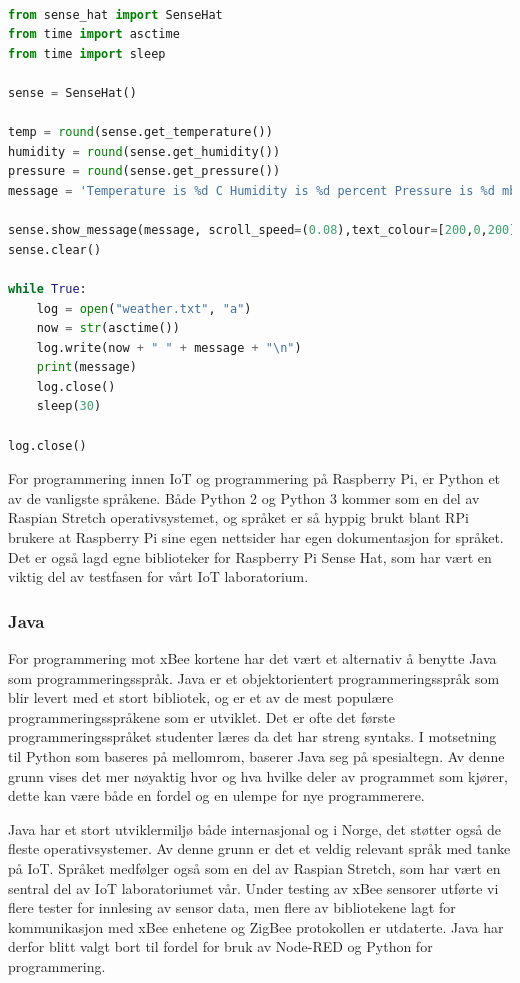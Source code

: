 \documentclass{article}
\begin{document}
\begin{lstlisting}[language=Python, caption=Python eksempel]

from sense_hat import SenseHat
from time import asctime
from time import sleep

sense = SenseHat()

temp = round(sense.get_temperature())
humidity = round(sense.get_humidity())
pressure = round(sense.get_pressure())
message = 'Temperature is %d C Humidity is %d percent Pressure is %d mbars' %(temp,humidity,pressure)

sense.show_message(message, scroll_speed=(0.08),text_colour=[200,0,200], back_colour= [0,0,200])
sense.clear()

while True:
    log = open("weather.txt", "a")
    now = str(asctime())
    log.write(now + " " + message + "\n")
    print(message)
    log.close()
    sleep(30)
    
log.close()
\end{lstlisting}

For programmering innen IoT og programmering på Raspberry Pi, er Python et av de vanligste språkene. Både Python 2 og Python 3 kommer som en del av Raspian Stretch operativsystemet, og språket er så hyppig brukt blant RPi brukere at Raspberry Pi sine egen nettsider har egen dokumentasjon for språket. Det er også lagd egne biblioteker for Raspberry Pi Sense Hat, som har vært en viktig del av testfasen for vårt IoT laboratorium. %

\subsubsection{Java}
For programmering mot xBee kortene har det vært et alternativ å benytte Java som programmeringsspråk. Java er et objektorientert programmeringsspråk som blir levert med et stort bibliotek, og er et av de mest populære programmeringsspråkene som er utviklet. Det er ofte det første programmeringsspråket studenter læres da det har streng syntaks. I motsetning til Python som baseres på mellomrom, baserer Java seg på spesialtegn. Av denne grunn vises det mer nøyaktig hvor og hva hvilke deler av programmet som kjører, dette kan være både en fordel og en ulempe for nye programmerere. 

Java har et stort utviklermiljø både internasjonal og i Norge, det støtter også de fleste operativsystemer. Av denne grunn er det et veldig relevant språk med tanke på IoT. Språket medfølger også som en del av Raspian Stretch, som har vært en sentral del av IoT laboratoriumet vår. Under testing av xBee sensorer utførte vi flere tester for innlesing av sensor data, men flere av bibliotekene lagt for kommunikasjon med xBee enhetene og ZigBee protokollen er utdaterte. Java har derfor blitt valgt bort til fordel for bruk av Node-RED og Python for programmering. 
\end{document}
